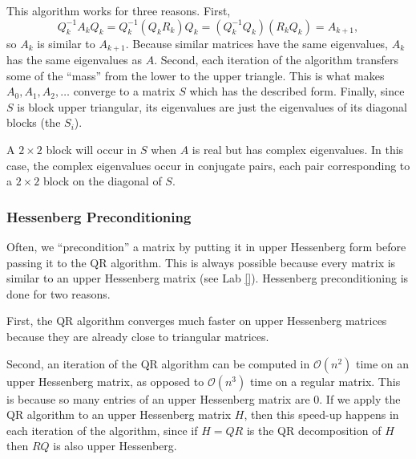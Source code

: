 This algorithm works for three reasons. First, 
\[
Q_k^{-1}A_kQ_k = Q_k^{-1}(Q_kR_k)Q_k = (Q_k^{-1}Q_k)(R_kQ_k) = A_{k+1},
\]
so $A_k$ is similar to $A_{k+1}$. 
Because similar matrices have the same eigenvalues, $A_k$ has the same eigenvalues as $A$. 
Second, each iteration of the algorithm transfers some of the ``mass'' from the lower to the upper triangle. 
This is what makes $A_0, A_1, A_2, \ldots$ converge to a matrix $S$ which has the described form. 
Finally, since $S$ is block upper triangular, its eigenvalues are just the eigenvalues of its diagonal blocks (the $S_i$).

A $2 \times 2$ block will occur in $S$ when $A$ is real but has complex eigenvalues. 
In this case, the complex eigenvalues occur in conjugate pairs, each pair corresponding to a $2 \times 2$ block on the diagonal of $S$.


\subsubsection*{Hessenberg Preconditioning}
Often, we ``precondition'' a matrix by putting it in upper Hessenberg form before passing it to the QR algorithm. 
This is always possible because every matrix is similar to an upper Hessenberg matrix (see Lab \ref{}). 
Hessenberg preconditioning is done for two reasons.

First, the QR algorithm converges much faster on upper Hessenberg matrices because they are already close to triangular matrices. 

Second, an iteration of the QR algorithm can be computed in $\mathcal{O}(n^2)$ time on an upper Hessenberg matrix, as opposed to $\mathcal{O}(n^3)$ time on a regular matrix. 
This is because so many entries of an upper Hessenberg matrix are 0.
If we apply the QR algorithm to an upper Hessenberg matrix $H$, then this speed-up happens in each iteration of the algorithm, since if $H = QR$ is the QR decomposition of $H$ then $RQ$ is also upper Hessenberg.



